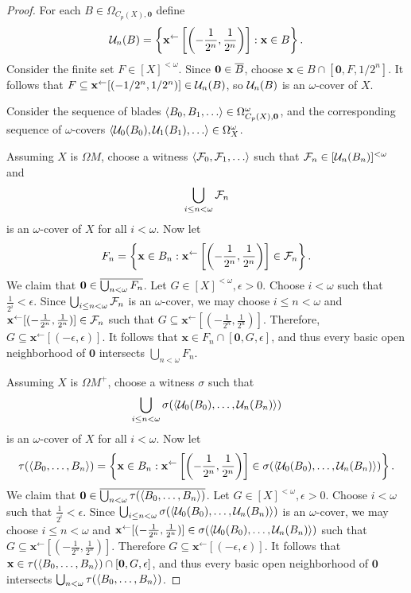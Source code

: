 \documentclass{amsart}
\renewcommand{\vec}{\mathbf}
\theoremstyle{plain}
\theoremstyle{definition}
\theoremstyle{remark}
\theoremstyle{plain}
\theoremstyle{definition}
\theoremstyle{remark}
\begin{document}
\begin{proof}
  For each \(B\in\Omega_{C_p(X),\vec 0}\) define
  \[
    \mc U_n(B)
      =
    \left\{
      \vec x^{\leftarrow}\left[\left(-\frac{1}{2^n},\frac{1}{2^n}\right)\right]
    :
      \vec x\in B
    \right\}
  .\]
  Consider the finite set \(F\in[X]^{<\omega}\). Since
  \(\vec 0\in\cl B\), choose \(\vec x\in B\cap[\vec 0,F,1/2^n]\).
  It follows that
  \(F\subseteq \vec x^{\leftarrow}[(-1/2^n,1/2^n)]\in\mc U_n(B)\),
  so \(\mathcal{U}_n(B)\) is an \(\omega\)-cover of \(X\).

  Consider the sequence of blades
  \(\<B_0,B_1,\dots\>\in\Omega_{C_p(X),\vec 0}^\omega\), and the
  corresponding sequence of \(\omega\)-covers
  \(\<\mc U_0(B_0),\mc U_1(B_1),\dots\>\in \Omega_X^\omega\).

  Assuming \(X\) is \(\Omega M\), choose a witness
  \(\<\mc F_0,\mc F_1,\dots\>\) such that
  \(\mathcal{F}_n\in[\mathcal{U}_n(B_n)]^{<\omega}\) and
  \[
    \bigcup_{i\leq n<\omega} \mathcal{F}_n
  \]
  is an \(\omega\)-cover of \(X\) for all \(i<\omega\).
  Now let
  \[
    F_n
      =
    \left\{
      \vec x\in B_n
    :
      \vec x^{\leftarrow}\left[\left(-\frac{1}{2^n},\frac{1}{2^n}\right)\right]
        \in
      \mc F_n
    \right\}
  .\]
  We claim that \(\vec 0\in\cl{\bigcup_{n<\omega}F_n}\).
  Let \(G\in[X]^{<\omega},\epsilon>0\). Choose \(i<\omega\) such that
  \(\frac{1}{2^i}<\epsilon\). Since \(\bigcup_{i\leq n<\omega} \mathcal{F}_n\)
  is an \(\omega\)-cover, we may choose
  \(i\leq n<\omega\) and
  \(\vec x^{\leftarrow}[(-\frac{1}{2^n},\frac{1}{2^n})]\in\mc F_n\)
  such that \(G\subseteq \vec x^{\leftarrow}[(-\frac{1}{2^n},\frac{1}{2^n})]\).
  Therefore, \(G\subseteq \vec x^{\leftarrow}[(-\epsilon,\epsilon)]\).
  It follows that \(\vec x\in F_n\cap[\vec 0,G,\epsilon]\), and thus
  every basic open neighborhood of \(\vec 0\) intersects
  \(\bigcup_{n<\omega}F_n\).

  Assuming \(X\) is \(\Omega M^+\), choose a witness
  \(\sigma\) such that
  \[
    \bigcup_{i\leq n<\omega} \sigma(\langle\mathcal{U}_0(B_0),\dots,\mathcal{U}_n(B_n)\rangle)
  \]
  is an \(\omega\)-cover of \(X\) for all \(i<\omega\).
  Now let
  \[
    \tau(\<B_0,\dots,B_n\>)
      =
    \left\{
      \vec x\in B_n
    :
      \vec x^{\leftarrow}\left[\left(-\frac{1}{2^n},\frac{1}{2^n}\right)\right]
        \in
      \sigma(\<\mc U_0(B_0),\dots,\mc U_n(B_n)\>)
    \right\}
  .\]
  We claim that \(\vec 0\in\cl{\bigcup_{n<\omega}\tau(\<B_0,\dots,B_n\>)}\).
  Let \(G\in[X]^{<\omega},\epsilon>0\). Choose \(i<\omega\) such that
  \(\frac{1}{2^i}<\epsilon\). Since
  \(\bigcup_{i\leq n<\omega} \sigma(\langle\mathcal{U}_0(B_0),\dots,\mathcal{U}_n(B_n)\rangle)\)
  is an \(\omega\)-cover, we may choose
  \(i\leq n<\omega\) and \(\vec x^{\leftarrow}[(-\frac{1}{2^n},\frac{1}{2^n})]
  \in\sigma(\<\mc U_0(B_0),\dots,\mc U_n(B_n)\>)\)
  such that \(G\subseteq \vec x^{\leftarrow}[(-\frac{1}{2^n},\frac{1}{2^n})]\).
  Therefore \(G\subseteq \vec x^{\leftarrow}[(-\epsilon,\epsilon)]\).
  It follows that \(\vec x\in \tau(\<B_0,\dots,B_n\>)\cap[\vec 0,G,\epsilon]\),
  and thus every basic open neighborhood of \(\vec 0\) intersects
  \(\bigcup_{n<\omega}\tau(\langle B_0,\dots,B_n\rangle)\).


\end{proof}
\end{document}
